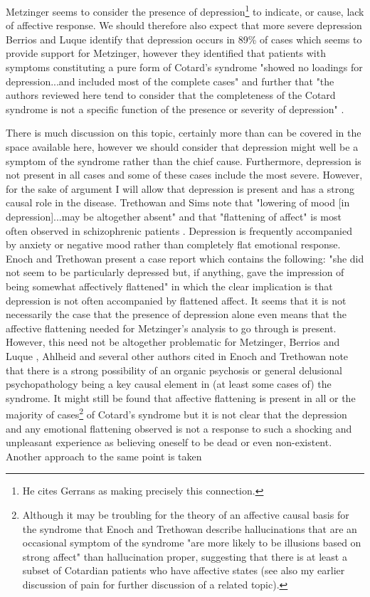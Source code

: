 Metzinger seems to consider the presence of depression\footnote{He \cite[pp. 457-458]{metzinger2003} cites Gerrans \cite[p. 112]{gerrans2000} as making precisely this connection.} to indicate, or cause, lack of affective response. We should therefore also expect that more severe depression Berrios and Luque identify that depression occurs in 89\% of cases which seems to provide support for Metzinger, however they identified that patients with symptoms constituting a pure form of Cotard's syndrome "showed no loadings for depression...and included most of the complete cases" and further that "the authors reviewed here tend to consider that the completeness of the Cotard syndrome is not a specific function of the presence or severity of depression" \cite[p. 187]{berrios1995b}.

There is much discussion on this topic, certainly more than can be covered in the space available here, however we should consider that depression might well be a symptom of the syndrome rather than the chief cause. Furthermore, depression is not present in all cases and some of these cases include the most severe. However, for the sake of argument I will allow that depression is present and has a strong causal role in the disease. Trethowan and Sims note that "lowering of mood [in depression]...may be altogether absent" and that "flattening of affect" is most often observed in schizophrenic patients \cite[p. 91]{trethowan1983}. Depression is frequently accompanied by anxiety or negative mood rather than completely flat emotional response. Enoch and Trethowan present a case report which contains the following: "she did not seem to be particularly depressed but, if anything, gave the impression of being somewhat affectively flattened" \cite[p. 170]{enoch1991} in which the clear implication is that depression is not often accompanied by flattened affect. It seems that it is not necessarily the case that the presence of depression alone even means that the affective flattening needed for Metzinger's analysis to go through is present. However, this need not be altogether problematic for Metzinger, Berrios and Luque \cite[p. 187]{berrios1995b}, Ahlheid \cite[p. 927]{ahlheid1968} and several other authors cited in Enoch and Trethowan \cite[pp. 177-178]{enoch1991} note that there is a strong possibility of an organic psychosis or general delusional psychopathology being a key causal element in (at least some cases of) the syndrome. It might still be found that affective flattening is present in all or the majority of cases\footnote{Although it may be troubling for the theory of an affective causal basis for the syndrome that Enoch and Trethowan describe hallucinations that are an occasional symptom of the syndrome "are more likely to be illusions based on strong affect" \cite[p. 174]{enoch1991} than hallucination proper, suggesting that there is at least a subset of Cotardian patients who have affective states (see also my earlier discussion of pain for further discussion of a related topic).} of Cotard's syndrome but it is not clear that the depression and any emotional flattening observed is not a response to such a shocking and unpleasant experience as believing oneself to be dead or even non-existent. Another approach to the same point is taken 